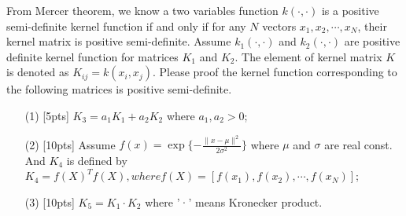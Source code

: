 \beginthishw
\begin{problem}
    From Mercer theorem, we know a two variables function $k(\cdot,\cdot)$ is a positive semi-definite kernel function if and only if for any $N$ vectors $x_1, x_2, \cdots, x_N$, their kernel matrix is positive semi-definite. Assume $k_1(\cdot, \cdot)$ and $k_2(\cdot,\cdot)$ are positive definite kernel function for matrices $K_1$ and $K_2$. The element of kernel matrix $K$ is denoted as $K_{ij} = k(x_i , x_j)$. Please proof the kernel function corresponding to the following matrices is positive semi-definite.
    \begin{enumerate}
        \item[(1)][5pts] $K_3 = a_1K_1 + a_2K_2$ where $a_1, a_2 > 0$;
        \item[(2)][10pts] Assume $f(x)=\exp\{-\frac{\|x-\mu\|^2}{2\sigma^2}\}$ where $\mu$ and $\sigma$ are real const. And $K_4$ is defined by $K_4 = f(X)^T f(X), where f(X) = [f(x_1), f(x_2), \cdots, f(x_N)]$;
        \item[(3)][10pts] $K_5 = K_1 \cdot K_2$ where ’·’ means Kronecker product.
    \end{enumerate}
\end{problem}



